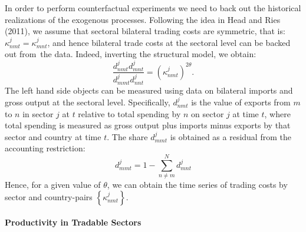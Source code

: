 \documentclass{article}
\begin{document}
In order to perform counterfactual experiments we need to back out the
historical realizations of the exogenous processes. Following the idea in
Head and Ries (2011), we assume that sectoral bilateral trading costs are
symmetric, that is: $\kappa _{nmt}^{j}=\kappa _{mnt}^{j}$, and hence
bilateral trade costs at the sectoral level can be backed out from\ the
data. Indeed, inverting the structural model, we obtain: 
\begin{equation}
\frac{d_{nmt}^{j}d_{mnt}^{j}}{d_{mmt}^{j}d_{nnt}^{j}}=\left( \kappa
_{nmt}^{j}\right) ^{2\theta }.  \label{kappa}
\end{equation}%
The left hand side objects can be measured using data on bilateral imports
and gross output at the sectoral level. Specifically, $d_{nmt}^{j}$ is the
value of exports from $m$ to $n$ in sector $j$ at $t$ relative to total
spending by $n$ on sector $j$ at time $t$, where total spending is measured
as gross output plus imports minus exports by that sector and country at
time $t.$ The share $d_{mmt}^{j}$ is obtained as a residual from the
accounting restriction: 
\begin{equation*}
d_{mmt}^{j}=1-\sum\limits_{n\neq m}^{N}d_{mnt}^{j} 
\end{equation*}%
Hence, for a given value of $\theta $, we can obtain the time series of
trading costs by sector and country-pairs $\left\{ \kappa _{nmt}^{j}\right\} 
$.

\paragraph{Productivity in Tradable Sectors}
\end{document}
